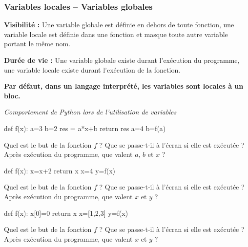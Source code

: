 \documentclass[10pt,fleqn]{article} %
\begin{document}
\subsubsection{Variables locales -- Variables globales}
\begin{defi}
\textbf{Visibilité :} Une variable globale est définie en dehors de toute fonction, une variable locale est définie dans une fonction et masque toute autre variable portant le même nom.

\textbf{Durée de vie :} Une variable globale existe durant l'exécution du programme, une variable locale existe durant l'exécution de la fonction.

\textbf{Par défaut, dans un langage interprété, les variables sont locales à un bloc.}
\end{defi}


\begin{exemple}

\textit{Comportement de Python lors de l'utilisation de variables}

\begin{minipage}[t]{.2\linewidth}
\begin{py}
\begin{python}
def f(x):
    a=3
    b=2
    res = a*x+b
    return res
a=4
b=f(a)
\end{python}
\end{py}
\end{minipage} \hfill
\begin{minipage}[t]{.78\linewidth}
Quel est le but de la fonction $f$ ? Que se passe-t-il à l'écran si elle est exécutée ? Après exécution du programme, que valent $a$, $b$ et $x$ ?
\end{minipage}

\vspace{2cm}

\begin{minipage}[t]{.2\linewidth}
\begin{py}
\begin{python}
def f(x):
    x=x+2
    return x
x=4
y=f(x)
\end{python}
\end{py}
\end{minipage} \hfill
\begin{minipage}[t]{.78\linewidth}
Quel est le but de la fonction $f$ ? Que se passe-t-il à l'écran si elle est exécutée ? Après exécution du programme, que valent $x$ et $y$ ?
\end{minipage}

\begin{minipage}[t]{.2\linewidth}
\begin{py}
\begin{python}
def f(x):
    x[0]=0
    return x
x=[1,2,3]
y=f(x)
\end{python}
\end{py}
\end{minipage} \hfill
\begin{minipage}[t]{.78\linewidth}
Quel est le but de la fonction $f$ ? Que se passe-t-il à l'écran si elle est exécutée ? Après exécution du programme, que valent $x$ et $y$ ?
\end{minipage}

\end{exemple}
\end{document}
